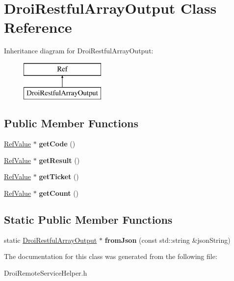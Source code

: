 \hypertarget{class_droi_restful_array_output}{}\section{Droi\+Restful\+Array\+Output Class Reference}
\label{class_droi_restful_array_output}
Inheritance diagram for Droi\+Restful\+Array\+Output\+:\begin{figure}[H]
\begin{center}
\leavevmode
\includegraphics[height=2.000000cm]{de/dd8/class_droi_restful_array_output}
\end{center}
\end{figure}
\subsection*{Public Member Functions}
\begin{DoxyCompactItemize}
\item 
\mbox{\label{class_droi_restful_array_output_ad59e1b1e33ab93c802bc7eba00e5721b}} 
\hyperlink{class_ref_value}{Ref\+Value} $\ast$ {\bfseries get\+Code} ()
\item 
\mbox{\label{class_droi_restful_array_output_acf0ca1e0b38554367c4dc35326cf1c05}} 
\hyperlink{class_ref_value}{Ref\+Value} $\ast$ {\bfseries get\+Result} ()
\item 
\mbox{\label{class_droi_restful_array_output_a6fb9b7e88079b5b17865a4016b381e46}} 
\hyperlink{class_ref_value}{Ref\+Value} $\ast$ {\bfseries get\+Ticket} ()
\item 
\mbox{\label{class_droi_restful_array_output_a36e3026065b53426039d067da612a28a}} 
\hyperlink{class_ref_value}{Ref\+Value} $\ast$ {\bfseries get\+Count} ()
\end{DoxyCompactItemize}
\subsection*{Static Public Member Functions}
\begin{DoxyCompactItemize}
\item 
\mbox{\label{class_droi_restful_array_output_ab0a2bc062946c85c0bef081d19ccf20e}} 
static \hyperlink{class_droi_restful_array_output}{Droi\+Restful\+Array\+Output} $\ast$ {\bfseries from\+Json} (const std\+::string \&json\+String)
\end{DoxyCompactItemize}


The documentation for this class was generated from the following file\+:\begin{DoxyCompactItemize}
\item 
Droi\+Remote\+Service\+Helper.\+h\end{DoxyCompactItemize}
